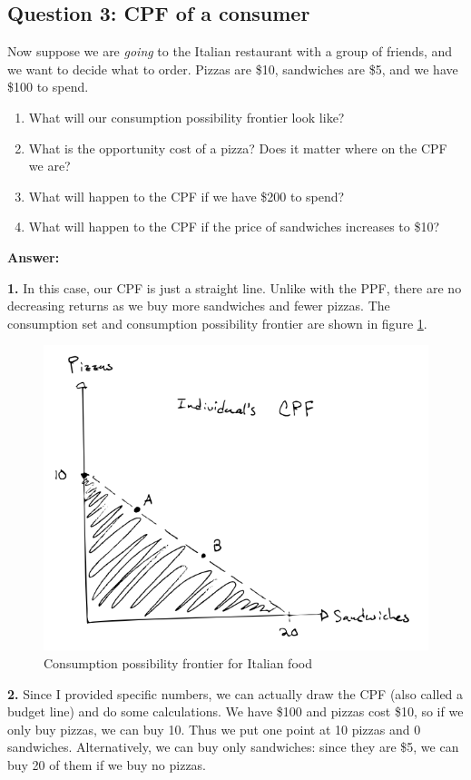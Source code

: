 \documentclass[12pt]{article}
\begin{document}
\medskip

\subsection*{Question 3: CPF of a consumer}
Now suppose we are \textit{going} to the Italian restaurant with a group of friends, and we want to decide what to order. Pizzas are \$10, sandwiches are \$5, and we have \$100 to spend.
    \begin{enumerate}
        \item What will our consumption possibility frontier look like?
        \item What is the opportunity cost of a pizza? Does it matter where on the CPF we are?
        \item What will happen to the CPF if we have \$200 to spend?
        \item What will happen to the CPF if the price of sandwiches increases to \$10?
    \end{enumerate}

\textbf{Answer:}

\textbf{1.} In this case, our CPF is just a straight line. Unlike with the PPF, there are no decreasing returns as we buy more sandwiches and fewer pizzas. The consumption set and consumption possibility frontier are shown in figure \ref{fig:CPF}.

\begin{figure}
    \centering
    \includegraphics[width=.75\textwidth]{CPF.png}
    \caption{Consumption possibility frontier for Italian food}
    \label{fig:CPF}
\end{figure}

\textbf{2.} Since I provided specific numbers, we can actually draw the CPF (also called a budget line) and do some calculations. We have \$100 and pizzas cost \$10, so if we only buy pizzas, we can buy 10. Thus we put one point at 10 pizzas and 0 sandwiches. Alternatively, we can buy only sandwiches: since they are \$5, we can buy 20 of them if we buy no pizzas.
\end{document}
